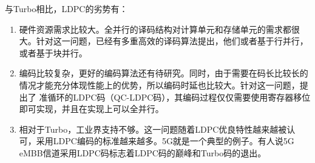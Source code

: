 \documentclass[10pt,a4paper,UTF8]{article}
\begin{document}
与Turbo相比，LDPC的劣势有：

\begin{enumerate}
\item 硬件资源需求比较大。全并行的译码结构对计算单元和存储单元的需求都很大。针对这一问题，已经有多重高效的译码算法提出，他们或者基于行并行，或者基于块并行。

\item 编码比较复杂，更好的编码算法还有待研究。同时，由于需要在码长比较长的情况才能充分体现性能上的优势，所以编码时延也比较大。针对这一问题，提出了 准循环的LDPC码（QC-LDPC码），其编码过程仅仅需要使用寄存器移位即可实现，并且在实现上可以全并行。

\item 相对于Turbo，工业界支持不够。这一问题随着LDPC优良特性越来越被认可，采用LDPC编码的标准越来越多。5G就是一个典型的例子。有人说5G eMBB信道采用LDPC码标志着LDPC码的巅峰和Turbo码的退出。
\end{enumerate}

\section{}
\label{sec:org359425d}
\end{document}
